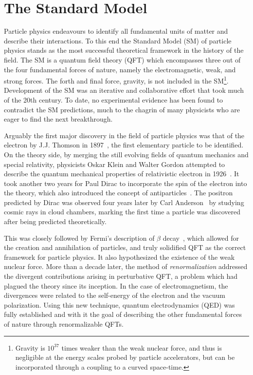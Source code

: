 \chapter{The Standard Model}
\label{chap:sm}

Particle physics endeavours to identify all fundamental units of matter and describe their interactions.
To this end the Standard Model (SM) of particle physics stands as the most successful theoretical framework in the history of the field.
The SM is a quantum field theory (QFT) which encompasses three out of the four fundamental forces of nature, namely the electromagnetic, weak, and strong forces.
The forth and final force, gravity, is not included in the SM\footnote{Gravity is $10^{37}$ times weaker than the weak nuclear force, and thus is negligible at the energy scales probed by particle accelerators, but can be incorporated through a coupling to a curved space-time.}.
Development of the SM was an iterative and collaborative effort that took much of the 20th century.
To date, no experimental evidence has been found to contradict the SM predictions, much to the chagrin of many physicists who are eager to find the next breakthrough.

Arguably the first major discovery in the field of particle physics was that of the electron by J.J. Thomson in 1897~\cite{ThomsonElectron}, the first elementary particle to be identified.
On the theory side, by merging the still evolving fields of quantum mechanics and special relativity, physicists Oskar Klein and Walter Gordon attempted to describe the quantum mechanical properties of relativistic electron in 1926~\cite{klein1926,Gordon1926}.
It took another two years for Paul Dirac to incorporate the spin of the electron into the theory, which also introduced the concept of  antiparticles~\cite{Dirac1928}.
The positron predicted by Dirac was observed four years later by Carl Anderson~\cite{PositiveElectron} by studying cosmic rays in cloud chambers, marking the first time a particle was discovered after being predicted theoretically.

This was closely followed by Fermi's description of $\beta$ decay~\cite{fermi1934}, which allowed for the creation and annihilation of particles, and truly solidified QFT as the correct framework for particle physics.
It also hypothesized the existence of the weak nuclear force.
More than a decade later, the method of \textit{renormalization} addressed the divergent contributions arising in perturbative QFT, a problem which had plagued the theory since its inception.
In the case of electromagnetism, the divergences were related to the self-energy of the electron and the vacuum polarization.
Using this new technique, quantum electrodynamics (QED) was fully established and with it the goal of describing the other fundamental forces of nature through renormalizable QFTs.

